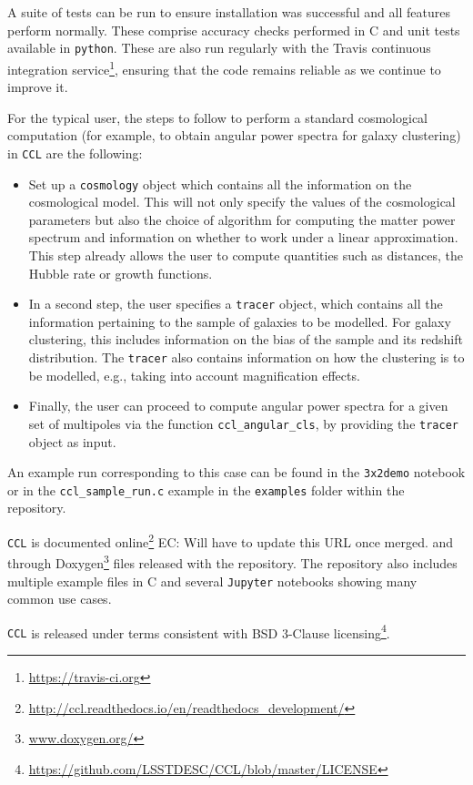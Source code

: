 \documentclass[\docopts]{\docclass}
\newcommand{\elisa}[1]{\textcolor{green!10!orange!90!}{EC: #1}}
\newcommand{\ccl}{{\tt CCL}\xspace}
\begin{document}
A suite of tests can be run to ensure installation was successful and all features perform normally. These comprise accuracy checks performed in C and unit tests available in {\tt python}. These are also run regularly with the Travis continuous integration service\footnote{\url{https://travis-ci.org}}, ensuring that the code remains reliable as we continue to improve it. 

For the typical user, the steps to follow to perform a standard cosmological computation (for example, to obtain angular power spectra for galaxy clustering) in \ccl are the following:
\begin{itemize}
\item Set up a {\tt cosmology} object which contains all the information on the cosmological model. This will not only specify the values of the cosmological parameters but also the choice of algorithm for computing the matter power spectrum and information on whether to work under a linear approximation. This step already allows the user to compute quantities such as distances, the Hubble rate or growth functions.
\item In a second step, the user specifies a {\tt tracer} object, which contains all the information pertaining to the sample of galaxies to be modelled. For galaxy clustering, this includes information on the bias of the sample and its redshift distribution. The {\tt tracer} also contains information on how the clustering is to be modelled, e.g., taking into account magnification effects. 
\item Finally, the user can proceed to compute angular power spectra for a given set of multipoles via the function {\tt ccl\_angular\_cls}, by providing the {\tt tracer} object as input.
\end{itemize}
An example run corresponding to this case can be found in the {\tt 3x2demo} notebook or in the {\tt ccl\_sample\_run.c} example in the {\tt examples} folder within the repository.

\ccl is documented online\footnote{\url{http://ccl.readthedocs.io/en/readthedocs_development/}} \elisa{Will have to update this URL once merged.} and through Doxygen\footnote{\url{www.doxygen.org/}} files released with the repository. The repository also includes multiple example files in C and several {\tt Jupyter} notebooks showing many common use cases.

\ccl is released under terms consistent with BSD 3-Clause licensing\footnote{\url{https://github.com/LSSTDESC/CCL/blob/master/LICENSE}}.
\end{document}
